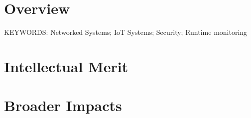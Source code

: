
\label{sec:summary}

\section*{Overview}

KEYWORDS: Networked Systems; IoT Systems; Security; Runtime monitoring

\section*{Intellectual Merit}

\section*{Broader Impacts}


